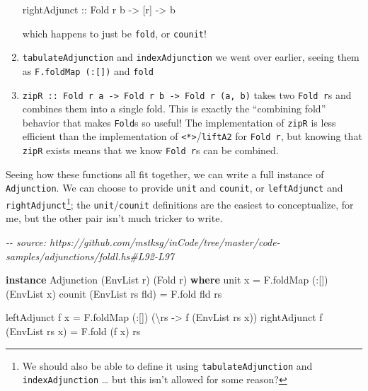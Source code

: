 \documentclass[]{article}
\newenvironment{Shaded}{}{}
\newcommand{\CommentTok}[1]{\textcolor[rgb]{0.38,0.63,0.69}{\textit{#1}}}
\newcommand{\DataTypeTok}[1]{\textcolor[rgb]{0.56,0.13,0.00}{#1}}
\newcommand{\KeywordTok}[1]{\textcolor[rgb]{0.00,0.44,0.13}{\textbf{#1}}}
\newcommand{\NormalTok}[1]{#1}
\newcommand{\OperatorTok}[1]{\textcolor[rgb]{0.40,0.40,0.40}{#1}}
\newcommand{\OtherTok}[1]{\textcolor[rgb]{0.00,0.44,0.13}{#1}}
\begin{document}
\begin{enumerate}
\begin{Shaded}
\begin{Highlighting}[]
\OtherTok{rightAdjunct\textquotesingle{} ::} \DataTypeTok{Fold}\NormalTok{ r b }\OtherTok{{-}>}\NormalTok{ [r] }\OtherTok{{-}>}\NormalTok{ b}
\end{Highlighting}
\end{Shaded}

  which happens to just be \texttt{fold}, or \texttt{counit}!
\item
  \texttt{tabulateAdjunction} and \texttt{indexAdjunction} we went over earlier,
  seeing them as \texttt{F.foldMap\ (:{[}{]})} and \texttt{fold}
\item
  \texttt{zipR\ ::\ Fold\ r\ a\ -\textgreater{}\ Fold\ r\ b\ -\textgreater{}\ Fold\ r\ (a,\ b)}
  takes two \texttt{Fold\ r}s and combines them into a single fold. This is
  exactly the ``combining fold'' behavior that makes \texttt{Fold}s so useful!
  The implementation of \texttt{zipR} is less efficient than the implementation
  of \texttt{\textless{}*\textgreater{}}/\texttt{liftA2} for \texttt{Fold\ r},
  but knowing that \texttt{zipR} exists means that we know \texttt{Fold\ r}s can
  be combined.
\end{enumerate}

Seeing how these functions all fit together, we can write a full instance of
\texttt{Adjunction}. We can choose to provide \texttt{unit} and \texttt{counit},
or \texttt{leftAdjunct} and \texttt{rightAdjunct}\footnote{We should also be
  able to define it using \texttt{tabulateAdjunction} and
  \texttt{indexAdjunction} \ldots{} but this isn't allowed for some reason?};
the \texttt{unit}/\texttt{counit} definitions are the easiest to conceptualize,
for me, but the other pair isn't much tricker to write.

\begin{Shaded}
\begin{Highlighting}[]
\CommentTok{{-}{-} source: https://github.com/mstksg/inCode/tree/master/code{-}samples/adjunctions/foldl.hs\#L92{-}L97}

\KeywordTok{instance} \DataTypeTok{Adjunction}\NormalTok{ (}\DataTypeTok{EnvList}\NormalTok{ r) (}\DataTypeTok{Fold}\NormalTok{ r) }\KeywordTok{where}
\NormalTok{    unit x }\OtherTok{=}\NormalTok{ F.foldMap (}\OperatorTok{:}\NormalTok{[]) (}\OtherTok{\textasciigrave{}EnvList\textasciigrave{}}\NormalTok{ x)}
\NormalTok{    counit (}\DataTypeTok{EnvList}\NormalTok{ rs fld) }\OtherTok{=}\NormalTok{ F.fold fld rs}

\NormalTok{    leftAdjunct f x }\OtherTok{=}\NormalTok{ F.foldMap (}\OperatorTok{:}\NormalTok{[]) (\textbackslash{}rs }\OtherTok{{-}>}\NormalTok{ f (}\DataTypeTok{EnvList}\NormalTok{ rs x))}
\NormalTok{    rightAdjunct f (}\DataTypeTok{EnvList}\NormalTok{ rs x) }\OtherTok{=}\NormalTok{ F.fold (f x) rs}
\end{Highlighting}
\end{Shaded}
\end{document}
